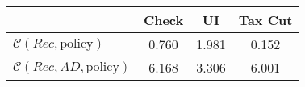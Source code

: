 \begin{tabular}{@{}lccc@{}} 
\toprule 
                          & Check      & UI    & Tax Cut    \\  \midrule 
$\mathcal{C}(Rec,\text{policy})$ & 0.760  & 1.981  & 0.152     \\ 
$\mathcal{C}(Rec, AD,\text{policy})$ & 6.168  & 3.306  & 6.001     \\ 
\end{tabular}  
